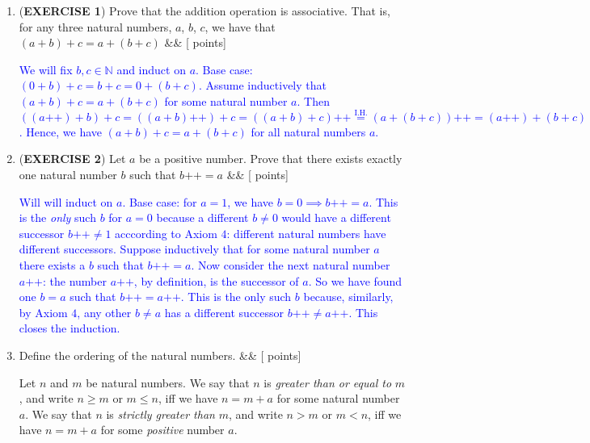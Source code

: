 \documentclass[12pt]{article}
\newcommand{\points}[1]{\hfill {[#1 points]}}
\newcommand{\problem}[2][]{%
  \item {#2}%
  \ifx&#1&%
  \else%
    \points{#1}%
  \fi
  \par\vspace{0.5em}
}
\begin{document}
\begin{enumerate}[leftmargin=*, label=\textbf{\arabic*.}]
    \problem{(\textbf{EXERCISE 1}) Prove that the addition operation is associative. That is, for any three natural numbers, $a$, $b$, $c$, we have that $(a+b)+c = a+(b+c)$}
    	\textcolor{blue}{We will fix $b,c \in \mathbb{N}$ and induct on $a$. Base case: $(0 + b) + c = b + c = 0 + (b + c).$ Assume inductively that $(a + b) + c = a + (b + c)$ for some natural number $a$. Then $((a\text{++}) + b) + c = ((a + b)\text{++}) + c = ((a+b) + c)\text{++} \overset{\text{I.H.}}{=} (a + (b + c))\text{++} = (a\text{++}) + (b+c)$. Hence, we have $(a+b)+c = a+(b+c)$ for all natural numbers $a$.}
	
	\problem{(\textbf{EXERCISE 2}) Let $a$ be a positive number. Prove that there exists exactly one natural number $b$ such that $b\text{++} = a$}
	\textcolor{blue}{Will will induct on $a$. Base case: for $a = 1$, we have $b=0 \implies b\text{++} = a$. This is the \textit{only} such $b$ for $a=0$ because a different $b \neq 0$ would have a different successor $b\text{++} \neq 1$ acccording to Axiom $4$: different natural numbers have different successors. Suppose inductively that for some natural number $a$ there exists a $b$ such that $b\text{++} = a$. Now consider the next natural number $a\text{++}$: the number $a\text{++}$, by definition, is the successor of $a$. So we have found one $b=a$ such that $b\text{++} = a\text{++}$. This is the only such $b$ because, similarly, by Axiom $4$, any other $b \neq a$ has a different successor $b\text{++} \neq a\text{++}$. This closes the induction.}
	
	\problem{Define the ordering of the natural numbers.}
	Let $n$ and $m$ be natural numbers. We say that $n$ is \textit{greater than or equal to} $m$, and write $n \geq m$ or $m \leq n$, iff we have $n = m + a$ for some natural number $a$. We say that $n$ is \textit{strictly greater than} $m$, and write $n > m$ or $m < n$, iff we have $n = m + a$ for some \textit{positive} number $a$.
	

\end{enumerate}
\end{document}
